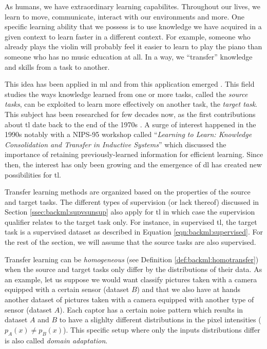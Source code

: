 As humans, we have extraordinary learning capabilites. Throughout our lives, we learn to move, communicate, interact with our environments and more. One specific learning ability that we possess is to use knowledge we have acquired in a given context to learn faster in a different context. For example, someone who already plays the violin will probably feel it easier to learn to play the piano than someone who has no music education at all. In a way, we ``transfer'' knowledge and skills from a task to another. 

This idea has been applied in \acrlong{ml} and from this application emerged  \parencite{yang2020transfer}. This field studies the ways knowledge learned from one or more tasks, called the \textit{source tasks}, can be exploited to learn more effectively on another task, the \textit{target task}. This subject has been researched for few decades now, as the first contributions about \acrlong{tl} date back to the end of the 1970s \parencite{bozinovski2020reminder}. A surge of interest happened in the 1990s notably with a NIPS-95 workshop called ``\textit{Learning to Learn: Knowledge Consolidation and Transfer in Inductive Systems}'' which discussed the importance of retaining previously-learned information for efficient learning. Since then, the interest has only been growing and the emergence of \acrlong{dl} has created new possibilities for \acrlong{tl}. 

Transfer learning methods are organized based on the properties of the source and target tasks. The different types of supervision (or lack thereof) discussed in Section \ref{ssec:backml:supvsunsup} also apply for \acrlong{tl} in which case the supervision qualifier relates to the target task only. For instance, in supervised \acrlong{tl}, the target task is a supervised dataset as described in Equation \ref{eqn:backml:supervised}. For the rest of the section, we will assume that the source tasks are also supervised. 

Transfer learning can be \textit{homogeneous} (see Definition \ref{def:backml:homotransfer}) when the source and target tasks only differ by the distributions of their data. As an example, let us suppose we would want classify pictures taken with a camera equipped with a certain sensor (dataset $B$) and that we also have at hands another dataset of pictures taken with a camera equipped with another type of sensor (dataset $A$). Each captor has a certain noise pattern which results in dataset $A$ and $B$ to have a slighlty different distributions in the pixel intensities (\ie $p_A(x) \neq p_B(x)$). This specific setup where only the inputs distributions differ is also called \textit{domain adaptation}.  

